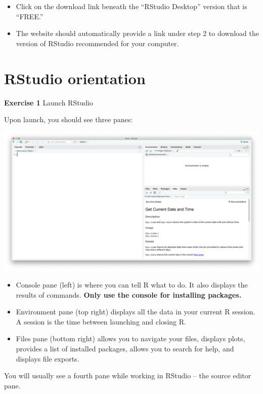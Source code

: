 \documentclass[
]{book}
\providecommand{\tightlist}{%
  \setlength{\itemsep}{0pt}\setlength{\parskip}{0pt}}
\newenvironment{learncheck}%
{%
  \par\vspace{\baselineskip}\noindent 
  \color{Exercise}\begin{itshape}%
  \par\vspace{\baselineskip}\noindent\ignorespaces 
}%
{%
  \end{itshape}\ignorespacesafterend 
}
\begin{document}
\begin{itemize}
\tightlist
\item
  Click on the download link beneath the ``RStudio Desktop'' version that is ``FREE.''
\item
  The website should automatically provide a link under step 2 to download the version of RStudio recommended for your computer.
\end{itemize}

\hypertarget{rstudio-orientation}{%
\section{RStudio orientation}\label{rstudio-orientation}}

\begin{learncheck}
\textbf{Exercise 1} Launch RStudio
\end{learncheck}

Upon launch, you should see three panes:

\includegraphics[width=26.4in]{images/rstudio_sshot}

\begin{itemize}
\tightlist
\item
  Console pane (left) is where you can tell R what to do. It also displays the results of commands. \textbf{Only use the console for installing packages.}
\item
  Environment pane (top right) displays all the data in your current R session. A session is the time between launching and closing R.
\item
  Files pane (bottom right) allows you to navigate your files, displays plots, provides a list of installed packages, allows you to search for help, and displays file exports.
\end{itemize}

You will usually see a fourth pane while working in RStudio -- the source editor pane.
\end{document}

